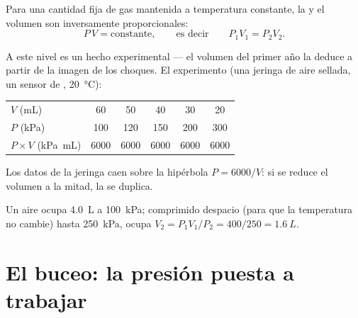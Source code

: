 \begin{proposition}\label{prop:g10:pressure:boyle}
Para una cantidad fija de gas mantenida a temperatura constante, la
 y el volumen son inversamente proporcionales:
\[
P \, V = \text{constante},
\qquad\text{es decir}\qquad
P_1 V_1 = P_2 V_2 .
\]
\end{proposition}
\admitted

\begin{remark}
A este nivel es un hecho experimental --- el volumen del primer año la
deduce a partir de la imagen de los choques. El experimento (una jeringa
de aire sellada, un sensor de , \qty{20}{\degreeCelsius}):
\begin{center}
\begin{tabular}{lccccc}
$V$ (\unit{mL}) & 60 & 50 & 40 & 30 & 20 \\
$P$ (\unit{kPa}) & 100 & 120 & 150 & 200 & 300 \\
$P \times V$ (\unit{kPa.mL}) & 6000 & 6000 & 6000 & 6000 & 6000
\end{tabular}
\end{center}
\end{remark}

\begin{omfigure}

{\small Los datos de la jeringa caen sobre la hipérbola $P = 6000/V$: si
se reduce el volumen a la mitad, la  se duplica.}
\end{omfigure}

\begin{example}\label{ex:g10:pressure:boyle}
Un aire ocupa \qty{4.0}{L} a \qty{100}{kPa}; comprimido despacio (para
que la temperatura no cambie) hasta \qty{250}{kPa}, ocupa
$V_2 = P_1 V_1 / P_2 = 400/250 = \qty{1.6}{L}$.
\end{example}

\section{El buceo: la presión puesta a trabajar}

